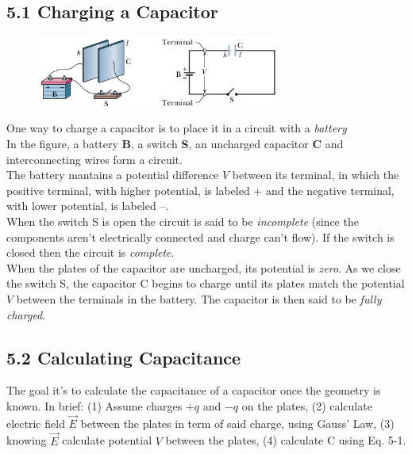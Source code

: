 \documentclass[12pt, a4paper]{article}
\begin{document}
		
		\subsection*{5.1 Charging a Capacitor}
		
		\begin{figure}
			\centering
			\includegraphics[width=8cm]{Physics2_PNGs/capacitor-charging.png}
			\caption*{}
			\label{fig:capacitor-charging.png}
		\end{figure}
		One way to charge a capacitor is to place it in a circuit with a \textit{battery} \\
		In the figure, a battery \textbf{B}, a switch \textbf{S}, an uncharged capacitor \textbf{C} and interconnecting wires form a circuit. \\
		The battery mantains a potential difference $V$ between its terminal, in which the positive terminal, with higher potential, is labeled + and the negative terminal, with lower potential, is labeled --. \\
		When the switch S is open the circuit is said to be \textit{incomplete} (since the components aren't electrically connected and charge can't flow). If the switch is closed then the circuit is \textit{complete}. \\
		When the plates of the capacitor are uncharged, its potential is \textit{zero}. As we close the switch S, the capacitor C begins to charge until its plates match the potential $V$ between the terminals in the battery. The capacitor is then said to be \textit{fully charged}. 
		
		
		
		\newpage
		
		\subsection*{5.2 Calculating Capacitance}
		
		The goal it's to calculate the capacitance of a capacitor once the geometry is known. In brief: (1) Assume charges $+q$ and $-q$ on the plates, (2) calculate electric field $\vec{E}$ between the plates in term of said charge, using Gauss' Law, (3) knowing $\vec{E}$ calculate potential $V$ between the plates, (4) calculate C using Eq. 5-1.
		
\end{document}
